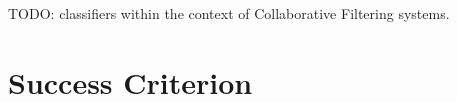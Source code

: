 TODO: classifiers within the context of Collaborative Filtering systems. 






\section{Success Criterion}

